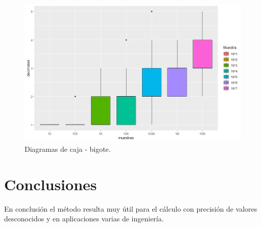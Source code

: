 \documentclass{article}
\begin{document}
\begin{figure} %
    \centering
    \includegraphics[width=170mm]{fig1.png} %
    \caption{Diagramas de caja - bigote.}
    \label{fig1}
\end{figure}


 
\section{Conclusiones} 
En conclusión el método resulta muy útil para el cálculo con precisión de valores desconocidos y en aplicaciones varias de ingeniería. 





\end{document}
